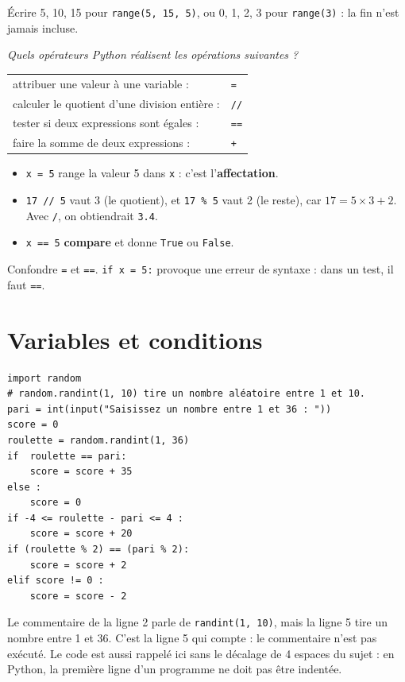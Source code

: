 \documentclass[addpoints, 11pt]{exam}
\newcommand{\enonce}[1]{\textit{#1}\par\smallskip}
\newcommand{\code}[1]{\texttt{#1}}
\DeclareRobustCommand{\_}{\textunderscore\allowbreak}
\begin{document}
\begin{questions}
\begin{erreur}
Écrire 5, 10, 15 pour \code{range(5, 15, 5)}, ou 0, 1, 2, 3 pour \code{range(3)} : la fin n'est jamais incluse.
\end{erreur}

\question[2] \enonce{Quels opérateurs Python réalisent les opérations suivantes ?}
\begin{reponse}
\begin{tabular}{ll}
attribuer une valeur à une variable : & \code{=}\\
calculer le quotient d'une division entière : & \code{//}\\
tester si deux expressions sont égales : & \code{==}\\
faire la somme de deux expressions : & \code{+}\\
\end{tabular}
\end{reponse}
\begin{itemize}
  \item \code{x = 5} range la valeur 5 dans \code{x} : c'est l'\textbf{affectation}.
  \item \code{17 // 5} vaut 3 (le quotient), et \code{17 \% 5} vaut 2 (le reste), car $17 = 5 \times 3 + 2$. Avec \code{/}, on obtiendrait \code{3.4}.
  \item \code{x == 5} \textbf{compare} et donne \code{True} ou \code{False}.
\end{itemize}

\begin{erreur}
Confondre \code{=} et \code{==}. \code{if x = 5:} provoque une erreur de syntaxe : dans un test, il faut \code{==}.
\end{erreur}

\section{Variables et conditions}

\begin{lstlisting}
import random
# random.randint(1, 10) tire un nombre aléatoire entre 1 et 10.
pari = int(input("Saisissez un nombre entre 1 et 36 : "))
score = 0
roulette = random.randint(1, 36)
if  roulette == pari:
    score = score + 35
else :
    score = 0
if -4 <= roulette - pari <= 4 :
    score = score + 20
if (roulette % 2) == (pari % 2):
    score = score + 2
elif score != 0 :
    score = score - 2
\end{lstlisting}
\begin{remarque}
Le commentaire de la ligne 2 parle de \code{randint(1, 10)}, mais la ligne 5 tire un nombre entre 1 et 36. C'est la ligne 5 qui compte : le commentaire n'est pas exécuté. Le code est aussi rappelé ici sans le décalage de 4 espaces du sujet : en Python, la première ligne d'un programme ne doit pas être indentée.
\end{remarque}


\end{questions}
\end{document}
